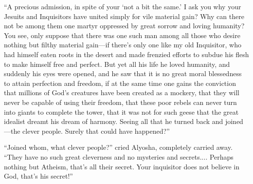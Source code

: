 ``A precious admission, in spite of your `not a bit the same.' I ask
you why your Jesuits and Inquisitors have united simply for vile
material gain? Why can there not be among them one martyr oppressed by
great sorrow and loving humanity? You see, only suppose that there was
one such man among all those who desire nothing but filthy material
gain---if there's only one like my old Inquisitor, who had himself
eaten roots in the desert and made frenzied efforts to subdue his
flesh to make himself free and perfect. But yet all his life he loved
humanity, and suddenly his eyes were opened, and he saw that it is no
great moral blessedness to attain perfection and freedom, if at the
same time one gains the conviction that millions of God's creatures
have been created as a mockery, that they will never be capable of
using their freedom, that these poor rebels can never turn into giants
to complete the tower, that it was not for such geese that the great
idealist dreamt his dream of harmony. Seeing  all that he
turned back and joined---the clever people. Surely that could have
happened?''

``Joined whom, what clever people?'' cried Alyosha, completely carried
away. ``They have no such great cleverness and no mysteries and
secrets.... Perhaps nothing but Atheism, that's all their secret. Your
inquisitor does not believe in God, that's his secret!''


